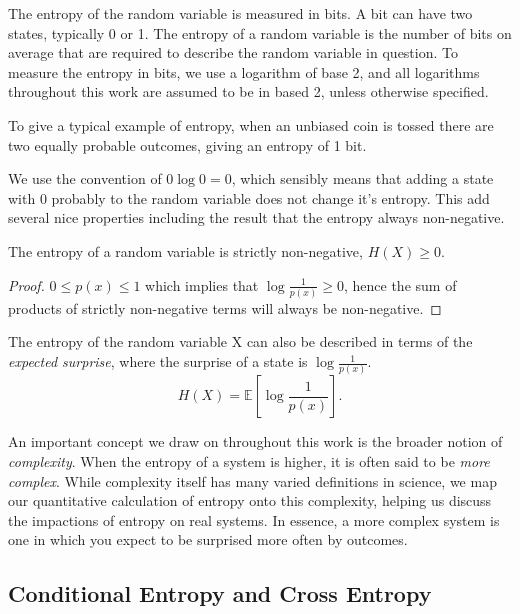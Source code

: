 The entropy of the random variable is measured in bits. A bit can have two states, typically 0 or 1. The entropy of a random variable is the number of bits on average that are required to describe the random variable in question. To measure the entropy in bits, we use a logarithm of base 2, and all logarithms throughout this work are assumed to be in based 2, unless otherwise specified.

To give a typical example of entropy, when an unbiased coin is tossed there are two equally probable outcomes, giving an entropy of 1 bit. 

\begin{remark}
We use the convention of $0\log 0 = 0$, which sensibly means that adding a state with 0 probably to the random variable does not change it's entropy. This add several nice properties including the result that the entropy always non-negative.
\end{remark}

\begin{lemma}
	The entropy of a random variable is strictly non-negative, $H(X) \geq 0$.
\end{lemma}

\begin{proof}
	$0 \leq p(x) \leq 1$ which implies that $\log \frac{1}{p(x)} \geq 0$,
	hence the sum of products of strictly non-negative terms will always be non-negative. 
\end{proof}

\begin{remark}
	The entropy of the random variable X can also be described in terms of the \emph{expected surprise}, where the surprise of a state is $\log \frac{1}{p(x)}$.
	\begin{equation}
		H(X) = \mathbb{E} \left[ \log  \frac{1}{p(x)} \right].
	\end{equation}
\end{remark}	

An important concept we draw on throughout this work is the broader notion of \emph{complexity}. When the entropy of a system is higher, it is often said to be \emph{more complex}. While complexity itself has many varied definitions in science, we map our quantitative calculation of entropy onto this complexity, helping us discuss the impactions of entropy on real systems. In essence, a more complex system is one in which you expect to be surprised more often by outcomes.

\subsection{Conditional Entropy and Cross Entropy}

